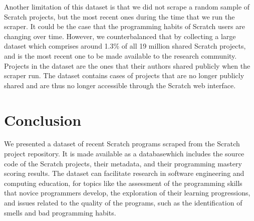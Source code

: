 \documentclass[10pt, conference]{IEEEtran}
\begin{document}
Another limitation of this dataset is that we did not scrape a random sample of Scratch projects, but the most recent ones during the time that we run the scraper.
It could be the case that the programming habits of Scratch users are changing over time.
However, we counterbalanced that by collecting a large dataset which comprises around 1.3\% of all 19 million shared Scratch projects, and is the most recent one to be made available to the research community.
Projects in the dataset are the ones that their authors shared publicly when the scraper run. The dataset contains cases of projects that are no longer publicly shared and are thus no longer accessible through the Scratch web interface.

\section{Conclusion}
We presented a dataset of recent Scratch programs scraped from the Scratch project repository.
It is made available as a database\footnotemark[\ref{dataseturl}] which includes the source code of the Scratch projects, their metadata, and their programming mastery scoring results.
The dataset can facilitate research in software engineering and computing education, for topics like the assessment of the programming skills that novice programmers develop, the exploration of their learning progressions, and issues related to the quality of the programs, such as the identification of smells and bad programming habits.



\end{document}
